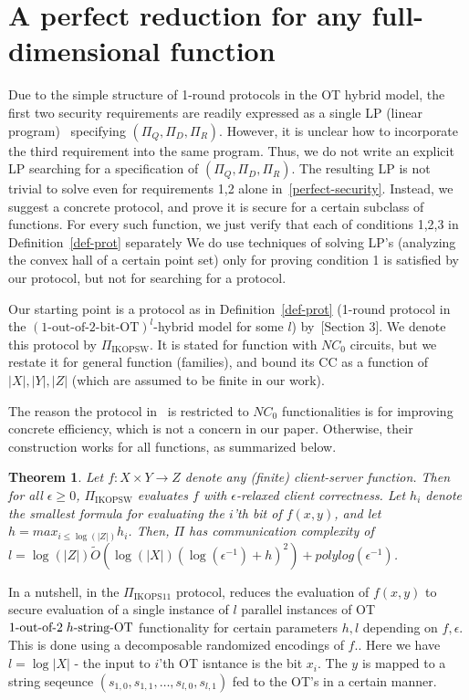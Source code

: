 \documentclass[a4paper]{article}
\newtheorem{theorem}{Theorem}[section]
\newcommand{\OT}[2]{#1\text{-out-of-}#2\text{-bit-OT}}
\newcommand{\sOT}[3]{#1\text{-out-of-}#2\text{\;$#3$-string-OT}}
\begin{document}
\section{A perfect reduction for any full-dimensional function}
Due to the simple structure of 1-round protocols in the OT hybrid model,
the first two security requirements are readily expressed as a single LP (linear program)~\cite{Kan39, Dantzig60} specifying $(\Pi_Q,\Pi_D,\Pi_R)$. However,
it is unclear how to incorporate the third requirement into the same program. Thus, we do not write an explicit LP searching for a specification of $(\Pi_Q,\Pi_D,\Pi_R)$.
The resulting LP is not trivial to solve even for requirements 1,2 alone in~\ref{perfect-security}. Instead, we suggest a concrete protocol, and prove it is secure for a certain subclass of functions. 
For every such function, we just verify that each of conditions 1,2,3 in Definition~\ref{def-prot} separately
We do use techniques of solving LP's (analyzing the convex hall of a certain point set) only for proving condition 1 is satisfied by our protocol, but not for searching for a protocol.

Our starting point is a protocol as in Definition~\ref{def-prot} (1-round protocol in the $(\OT{1}{2})^l$-hybrid model for some $l$) by~\cite{IKOPS11}[Section 3]. We denote this protocol by $\Pi_{\text{IKOPSW}}$. It is stated for function with $NC_0$ circuits, but we restate it for general function (families), and bound its CC as a function of $|X|,|Y|,|Z|$ (which are assumed to be finite in our work). 

The reason the protocol in~\cite{IKOPS11} is restricted to $NC_0$ functionalities is for improving concrete efficiency, which is not a concern in our paper.
Otherwise, their construction works for all functions, as summarized below.

\begin{theorem}
	Let $f:X\times Y\rightarrow Z$ denote any (finite) client-server function.
	Then for all $\epsilon \geq 0$, $\Pi_{\text{IKOPSW}}$ evaluates $f$ with $\epsilon$-relaxed client correctness. 
	Let $h_i$ denote the smallest formula for evaluating the $i$'th bit of $f(x,y)$, and let $h = max_{i\leq \log(|Z|)} h_i$.
	Then, $\Pi$ has communication complexity of $l=\log(|Z|)\tilde{O}(\log(|X|) (\log({\epsilon^{-1}})+h)^2)+polylog(\epsilon^{-1})$.
\end{theorem}

In a nutshell, in the $\Pi_{\text{IKOPS11}}$ protocol, reduces the evaluation of $f(x,y)$ to secure evaluation of a single instance of $l$ parallel instances of OT $\sOT{1}{2}{h}$ functionality for certain parameters $h,l$ depending on $f,\epsilon$. This is done using a decomposable randomized encodings of $f$.\cite{BennysThesis}. Here we have $l=\log{|X|}$ - the input to $i$'th OT isntance is the bit $x_i$. 
The $y$ is mapped to a string seqeunce ${(s_{1,0},s_{1,1},\ldots,s_{l,0},s_{l,1})}$ fed to the OT's in a certain manner.
\end{document}
